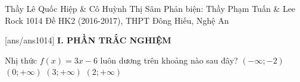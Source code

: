 \begin{name}
{Thầy Lê Quốc Hiệp \& Cô Huỳnh Thị Sâm \newline 
Phản biện: Thầy Phạm Tuấn \& Lee Rock }
{1014 Đề HK2 (2016-2017), THPT Đông Hiếu, Nghệ An}
	\end{name}
	\setcounter{ex}{0}\setcounter{bt}{0}
	[ans/ans1014]
\noindent\textbf{I. PHẦN TRẮC NGHIỆM}
\begin{ex}%
	Nhị thức $ f(x) = 3x - 6 $ luôn dương trên khoảng nào sau đây?
	\choice
	{$ \left( { - \infty ; - 2} \right) $}
	{$(0;+ \infty )$}
	{ $ (3; +\infty) $}
	{\True $  (2; + \infty) $}
	
\end{ex}

